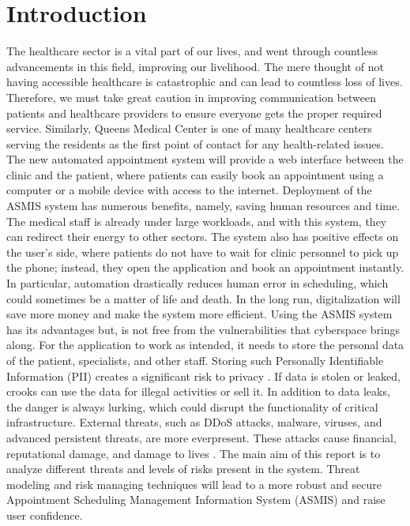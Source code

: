 \chapter{Introduction}
The healthcare sector is a vital part of our lives, and went through countless advancements in this field, improving our livelihood. The mere thought of not having accessible healthcare is catastrophic and can lead to countless loss of lives. Therefore, we must take great caution in improving communication between patients and healthcare providers to ensure everyone gets the proper required service.\newline \newline
Similarly, Queens Medical Center is one of many healthcare centers serving the 
residents as the first point of contact for any health-related issues. The new automated appointment system will provide a web interface between the clinic and the patient, where patients can easily book an appointment using a computer or a mobile device with access to the internet.\newline\newline
Deployment of the ASMIS system has numerous benefits, namely, saving human resources and time. The medical staff is already under large workloads, and with this system, they can redirect their energy to other sectors. The system also has positive effects on the user's side, where patients do not have to wait for clinic personnel to pick up the phone; instead, they open the application and book an appointment instantly. In particular, automation drastically reduces human error in scheduling, which could sometimes be a matter of life and death. In the long run, digitalization will save more money and make the system more efficient.\newline\newline
Using the ASMIS system has its advantages but, is not free from the vulnerabilities that cyberspace brings along. For the application to work as intended, it needs to store the personal data of the patient, specialists, and other staff. Storing such Personally Identifiable Information (PII) creates a significant risk to privacy \citep[p.~374]{IOT}. If data is stolen or leaked, crooks can use the data for illegal activities or sell it. In addition to data leaks, the danger is always lurking, which could disrupt the functionality of critical infrastructure. External threats, such as DDoS attacks, malware, viruses, and advanced persistent threats, are more everpresent. These attacks cause financial, reputational damage, and damage to lives \citep[p.~377]{IOT}.\newline\newline
The main aim of this report is to analyze different threats and levels of risks present in the system. Threat modeling and risk managing techniques will lead to a more robust and secure Appointment Scheduling Management Information System (ASMIS) and raise user confidence.